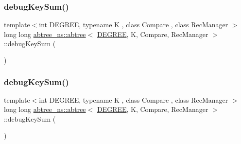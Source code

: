 \mbox{\label{classabtree__ns_1_1abtree_a68b1790129b4a9733717d32d0d9c572a}} 
\subsubsection{\texorpdfstring{debug\+Key\+Sum()}{debugKeySum()}\hspace{0.1cm}{\footnotesize\ttfamily [1/2]}}
{\footnotesize\ttfamily template$<$int D\+E\+G\+R\+EE, typename K , class Compare , class Rec\+Manager $>$ \\
long long \hyperlink{classabtree__ns_1_1abtree}{abtree\+\_\+ns\+::abtree}$<$ \hyperlink{brown__sigouin__abtree__kcas_2adapter_8h_a5d88b17d70c985f2f2b8e987037fd6dd}{D\+E\+G\+R\+EE}, K, Compare, Rec\+Manager $>$\+::debug\+Key\+Sum (\begin{DoxyParamCaption}{ }\end{DoxyParamCaption})\hspace{0.3cm}{\ttfamily [inline]}}

\mbox{\label{classabtree__ns_1_1abtree_a68b1790129b4a9733717d32d0d9c572a}} 
\subsubsection{\texorpdfstring{debug\+Key\+Sum()}{debugKeySum()}\hspace{0.1cm}{\footnotesize\ttfamily [2/2]}}
{\footnotesize\ttfamily template$<$int D\+E\+G\+R\+EE, typename K , class Compare , class Rec\+Manager $>$ \\
long long \hyperlink{classabtree__ns_1_1abtree}{abtree\+\_\+ns\+::abtree}$<$ \hyperlink{brown__sigouin__abtree__kcas_2adapter_8h_a5d88b17d70c985f2f2b8e987037fd6dd}{D\+E\+G\+R\+EE}, K, Compare, Rec\+Manager $>$\+::debug\+Key\+Sum (\begin{DoxyParamCaption}{ }\end{DoxyParamCaption})\hspace{0.3cm}{\ttfamily [inline]}}

\mbox{\label{classabtree__ns_1_1abtree_aa88728d950187868d9b97cb65dcb5e83}} 
